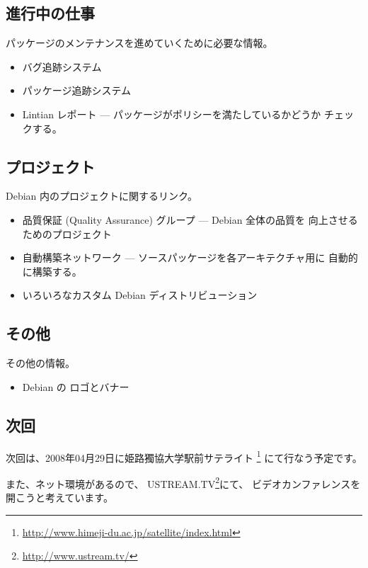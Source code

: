 \documentclass[mingoth,a4paper]{jsarticle}
\begin{document}
\subsection{進行中の仕事}

パッケージのメンテナンスを進めていくために必要な情報。

\begin{itemize}
\item バグ追跡システム
\item パッケージ追跡システム
\item Lintian レポート --- パッケージがポリシーを満たしているかどうか
  チェックする。
\end{itemize}

\subsection{プロジェクト}

Debian 内のプロジェクトに関するリンク。

\begin{itemize}
\item 品質保証 (Quality Assurance) グループ --- Debian 全体の品質を
  向上させるためのプロジェクト
\item 自動構築ネットワーク --- ソースパッケージを各アーキテクチャ用に
  自動的に構築する。
\item いろいろなカスタム Debian ディストリビューション
\end{itemize}

\subsection{その他}

その他の情報。

\begin{itemize}
\item Debian の ロゴとバナー
\end{itemize}


\subsection{次回}
次回は、2008年04月29日に姫路獨協大学駅前サテライト
\footnote{\url{http://www.himeji-du.ac.jp/satellite/index.html}}
にて行なう予定です。

また、ネット環境があるので、
USTREAM.TV\footnote{\url{http://www.ustream.tv/}}にて、
ビデオカンファレンスを開こうと考えています。
\end{document}
